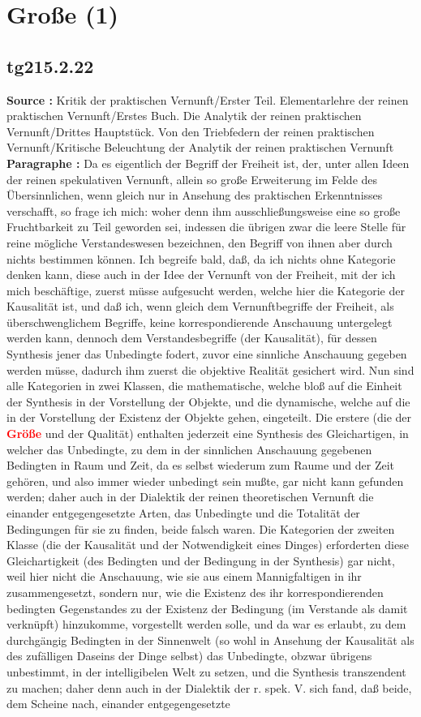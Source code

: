 \documentclass[a4paper,12pt,twoside]{book}
\newcommand{\match}[1]{\textcolor{red}{\textbf{#1}}}
\newcommand{\unnumberedsection}[1]{
	\section*{#1}
	\addcontentsline{toc}{section}{#1}
	\markright{#1}
}
\begin{document}
	\unnumberedsection{Große (1)} 
	\subsection*{tg215.2.22} 
	\textbf{Source : }Kritik der praktischen Vernunft/Erster Teil. Elementarlehre der reinen praktischen Vernunft/Erstes Buch. Die Analytik der reinen praktischen Vernunft/Drittes Hauptstück. Von den Triebfedern der reinen praktischen Vernunft/Kritische Beleuchtung der Analytik der reinen praktischen Vernunft\\  
	
	\noindent\textbf{Paragraphe : }Da es eigentlich der Begriff der Freiheit ist, der, unter allen Ideen der reinen spekulativen Vernunft, allein so große Erweiterung im Felde des Übersinnlichen, wenn gleich nur in Ansehung des praktischen Erkenntnisses verschafft, so frage ich mich: woher denn ihm ausschließungsweise eine so große Fruchtbarkeit zu Teil geworden sei, indessen die übrigen zwar die leere Stelle für reine mögliche Verstandeswesen bezeichnen, den Begriff von ihnen aber durch nichts bestimmen können. Ich begreife bald, daß, da ich nichts ohne Kategorie denken kann, diese auch in der Idee der Vernunft von der Freiheit, mit der ich mich beschäftige, zuerst müsse aufgesucht werden, welche hier die Kategorie der Kausalität ist, und daß ich, wenn gleich dem Vernunftbegriffe der Freiheit, als überschwenglichem Begriffe, keine korrespondierende Anschauung untergelegt werden kann, dennoch dem Verstandesbegriffe (der Kausalität), für dessen Synthesis jener das Unbedingte fodert, zuvor eine sinnliche Anschauung gegeben werden müsse, dadurch ihm zuerst die objektive Realität gesichert wird. Nun sind alle Kategorien in zwei Klassen, die mathematische, welche bloß auf die Einheit der Synthesis in der Vorstellung der Objekte, und die dynamische, welche auf die in der Vorstellung der Existenz der Objekte gehen, eingeteilt. Die erstere (die der \match{Größe} und der Qualität) enthalten jederzeit eine Synthesis des Gleichartigen, in welcher das Unbedingte, zu dem in der sinnlichen Anschauung gegebenen Bedingten in Raum und Zeit, da es selbst wiederum zum Raume und der Zeit gehören, und also  immer wieder unbedingt sein mußte, gar nicht kann gefunden werden; daher auch in der Dialektik der reinen theoretischen Vernunft die einander entgegengesetzte Arten, das Unbedingte und die Totalität der Bedingungen für sie zu finden, beide falsch waren. Die Kategorien der zweiten Klasse (die der Kausalität und der Notwendigkeit eines Dinges) erforderten diese Gleichartigkeit (des Bedingten und der Bedingung in der Synthesis) gar nicht, weil hier nicht die Anschauung, wie sie aus einem Mannigfaltigen in ihr zusammengesetzt, sondern nur, wie die Existenz des ihr korrespondierenden bedingten Gegenstandes zu der Existenz der Bedingung (im Verstande als damit verknüpft) hinzukomme, vorgestellt werden solle, und da war es erlaubt, zu dem durchgängig Bedingten in der Sinnenwelt (so wohl in Ansehung der Kausalität als des zufälligen Daseins der Dinge selbst) das Unbedingte, obzwar übrigens unbestimmt, in der intelligibelen Welt zu setzen, und die Synthesis transzendent zu machen; daher denn auch in der Dialektik der r. spek. V. sich fand, daß beide, dem Scheine nach, einander entgegengesetzte 
\end{document}
